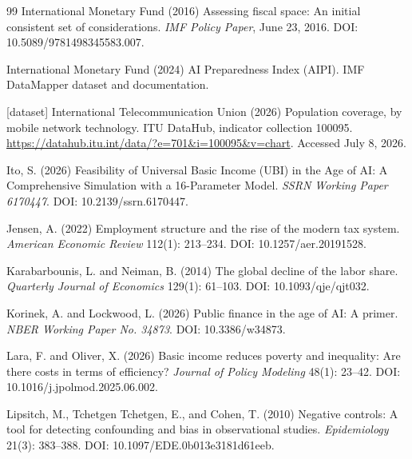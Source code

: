 \documentclass[11pt,a4paper]{article}
\begin{document}
\begin{thebibliography}{99}
International Monetary Fund (2016)
\newblock Assessing fiscal space: An initial consistent set of considerations.
\newblock \emph{IMF Policy Paper}, June 23, 2016. DOI: 10.5089/9781498345583.007.

International Monetary Fund (2024)
\newblock AI Preparedness Index (AIPI).
\newblock IMF DataMapper dataset and documentation.

[dataset] International Telecommunication Union (2026)
\newblock Population coverage, by mobile network technology.
\newblock ITU DataHub, indicator collection 100095.
\newblock \url{https://datahub.itu.int/data/?e=701&i=100095&v=chart}. Accessed July 8, 2026.

Ito, S. (2026)
\newblock Feasibility of Universal Basic Income (UBI) in the Age of AI: A Comprehensive Simulation with a 16-Parameter Model.
\newblock \emph{SSRN Working Paper 6170447}. DOI: 10.2139/ssrn.6170447.

Jensen, A. (2022)
\newblock Employment structure and the rise of the modern tax system.
\newblock \emph{American Economic Review} 112(1): 213--234. DOI: 10.1257/aer.20191528.

Karabarbounis, L. and Neiman, B. (2014)
\newblock The global decline of the labor share.
\newblock \emph{Quarterly Journal of Economics} 129(1): 61--103. DOI: 10.1093/qje/qjt032.

Korinek, A. and Lockwood, L. (2026)
\newblock Public finance in the age of AI: A primer.
\newblock \emph{NBER Working Paper No. 34873}. DOI: 10.3386/w34873.

Lara, F. and Oliver, X. (2026)
\newblock Basic income reduces poverty and inequality: Are there costs in terms of efficiency?
\newblock \emph{Journal of Policy Modeling} 48(1): 23--42. DOI: 10.1016/j.jpolmod.2025.06.002.

Lipsitch, M., Tchetgen Tchetgen, E., and Cohen, T. (2010)
\newblock Negative controls: A tool for detecting confounding and bias in observational studies.
\newblock \emph{Epidemiology} 21(3): 383--388. DOI: 10.1097/EDE.0b013e3181d61eeb.


\end{thebibliography}
\end{document}
